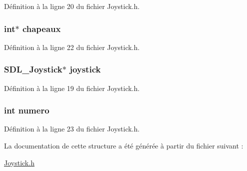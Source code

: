 Définition à la ligne 20 du fichier Joystick.\-h.

\hypertarget{struct_manette_abe08f36c0a251e0a68bd59d121d468c5}{
\subsubsection[{chapeaux}]{\setlength{\rightskip}{0pt plus 5cm}int$\ast$ chapeaux}}\label{struct_manette_abe08f36c0a251e0a68bd59d121d468c5}


Définition à la ligne 22 du fichier Joystick.\-h.

\hypertarget{struct_manette_a5fe6c6b426f70a21df07c64227b2c337}{
\subsubsection[{joystick}]{\setlength{\rightskip}{0pt plus 5cm}S\-D\-L\-\_\-\-Joystick$\ast$ joystick}}\label{struct_manette_a5fe6c6b426f70a21df07c64227b2c337}


Définition à la ligne 19 du fichier Joystick.\-h.

\hypertarget{struct_manette_a2c30f43104974e72e2809fb4569804b0}{
\subsubsection[{numero}]{\setlength{\rightskip}{0pt plus 5cm}int numero}}\label{struct_manette_a2c30f43104974e72e2809fb4569804b0}


Définition à la ligne 23 du fichier Joystick.\-h.



La documentation de cette structure a été générée à partir du fichier suivant \-:\begin{DoxyCompactItemize}
\item 
\hyperlink{_joystick_8h}{Joystick.\-h}\end{DoxyCompactItemize}
